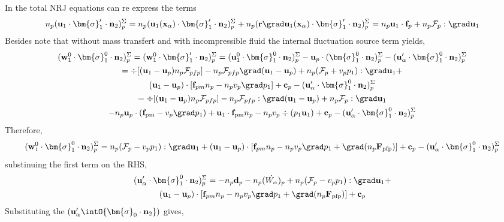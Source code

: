 In the total NRJ equations can re express the terms 
\begin{multline*}
    n_p (\textbf{u}_1 \cdot \bm{\sigma}_1' \cdot  \textbf{n}_2)^\Sigma_p
    = 
    n_p (\textbf{u}_1(\textbf{x}_\alpha) \cdot \bm{\sigma}_1' \cdot  \textbf{n}_2)^\Sigma_p
    + n_p (\textbf{r}\grad\textbf{u}_1(\textbf{x}_\alpha) \cdot \bm{\sigma}_1' \cdot  \textbf{n}_2)^\Sigma_p
    =n_p \textbf{u}_1 \cdot \textbf{f}_p
    + n_p \mathcal{F}_p :\grad \textbf{u}_1
\end{multline*}
Besides note that without mass transfert and with incompressible fluid the internal fluctuation source term yields,
\begin{multline*}
    (\textbf{w}_1^0 \cdot \bm{\sigma}_1^0 \cdot  \textbf{n}_2)^\Sigma_p
    =   
    (\textbf{w}_1^0 \cdot \bm{\sigma}_1' \cdot  \textbf{n}_2)^\Sigma_p
    =   
    (\textbf{u}_1^0 \cdot \bm{\sigma}_1^0 \cdot  \textbf{n}_2)^\Sigma_p
    - \textbf{u}_p \cdot (\bm{\sigma}_1^0 \cdot  \textbf{n}_2)^\Sigma_p
    - (\textbf{u}_\alpha' \cdot \bm{\sigma}_1^0 \cdot  \textbf{n}_2)^\Sigma_p\\
    =   
    \div [(\textbf{u}_1 - \textbf{u}_p) n_p \mathcal{F}_{pfp}]
    - n_p \mathcal{F}_{pfp} \grad (\textbf{u}_1 - \textbf{u}_p)
    +n_p(\mathcal{F}_p + v_p p_1): \grad \textbf{u}_1+\\
    (\textbf{u}_1 - \textbf{u}_p) \cdot [\textbf{f}_{pm}n_p - n_pv_p\grad p_1]
    + \textbf{c}_p
    - (\textbf{u}_\alpha' \cdot \bm{\sigma}_1^0 \cdot  \textbf{n}_2)^\Sigma_p\\
    =   
    \div [(\textbf{u}_1 - \textbf{u}_p) n_p \mathcal{F}_{pfp}]
    - n_p \mathcal{F}_{pfp} : \grad (\textbf{u}_1 - \textbf{u}_p)
    + n_p \mathcal{F}_p : \grad \textbf{u}_1\\
    - n_p \textbf{u}_p \cdot (\textbf{f}_\text{pm} - v_p\grad p_1)
    + \textbf{u}_1  \cdot \textbf{f}_\text{pm}n_p 
    - n_pv_p \div (p_1 \textbf{u}_1)
    + \textbf{c}_p
    - (\textbf{u}_\alpha' \cdot \bm{\sigma}_1^0 \cdot  \textbf{n}_2)^\Sigma_p\\
\end{multline*}
Therefore, 
\begin{equation}
    (\textbf{w}_1^0 \cdot \bm{\sigma}_1^0 \cdot  \textbf{n}_2)^\Sigma_p
    =   
    n_p(\mathcal{F}_p - v_p p_1): \grad \textbf{u}_1+
    (\textbf{u}_1 - \textbf{u}_p) \cdot [\textbf{f}_{pm}n_p - n_pv_p\grad p_1+\grad (n_p \textbf{F}_\text{pfp})] 
    + \textbf{c}_p
    - (\textbf{u}_\alpha' \cdot \bm{\sigma}_1^0 \cdot  \textbf{n}_2)^\Sigma_p\\
\end{equation}
substinuing the first term on the RHS,
\begin{multline}
    (\textbf{u}_\alpha' \cdot \bm{\sigma}_1^0 \cdot  \textbf{n}_2)^\Sigma_p
    =   
    - n_p\textbf{d}_p
    - n_p(\dot{W_\alpha})_p
    + n_p(\mathcal{F}_p - v_p p_1): \grad \textbf{u}_1+\\
    (\textbf{u}_1 - \textbf{u}_p) \cdot [\textbf{f}_{pm}n_p - n_pv_p\grad p_1+\grad (n_p \textbf{F}_\text{pfp})] 
    + \textbf{c}_p
\end{multline}
Substituting the $(\textbf{u}'_\alpha \intO{\bm{\sigma}_0 \cdot \textbf{n}_2})$ gives, 


